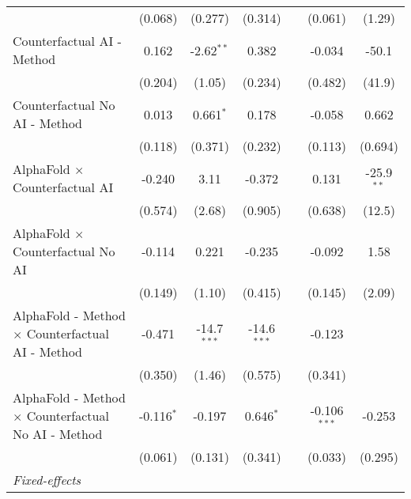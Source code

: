 \begin{tabular}{lcccccc}
                                                              & (0.068)       & (0.277)       & (0.314)        &                & (0.061)        & (1.29)\\   
   Counterfactual AI - Method                                 & 0.162         & -2.62$^{**}$  & 0.382          &                & -0.034         & -50.1\\   
                                                              & (0.204)       & (1.05)        & (0.234)        &                & (0.482)        & (41.9)\\   
   Counterfactual No AI - Method                              & 0.013         & 0.661$^{*}$   & 0.178          &                & -0.058         & 0.662\\   
                                                              & (0.118)       & (0.371)       & (0.232)        &                & (0.113)        & (0.694)\\   
   AlphaFold $\times$ Counterfactual AI                       & -0.240        & 3.11          & -0.372         &                & 0.131          & -25.9$^{**}$\\   
                                                              & (0.574)       & (2.68)        & (0.905)        &                & (0.638)        & (12.5)\\   
   AlphaFold $\times$ Counterfactual No AI                    & -0.114        & 0.221         & -0.235         &                & -0.092         & 1.58\\   
                                                              & (0.149)       & (1.10)        & (0.415)        &                & (0.145)        & (2.09)\\   
   AlphaFold - Method $\times$ Counterfactual AI - Method     & -0.471        & -14.7$^{***}$ & -14.6$^{***}$  &                & -0.123         &   \\   
                                                              & (0.350)       & (1.46)        & (0.575)        &                & (0.341)        &   \\   
   AlphaFold - Method $\times$ Counterfactual No AI - Method  & -0.116$^{*}$  & -0.197        & 0.646$^{*}$    &                & -0.106$^{***}$ & -0.253\\   
                                                              & (0.061)       & (0.131)       & (0.341)        &                & (0.033)        & (0.295)\\   
   \midrule
   \emph{Fixed-effects}\\

\end{tabular}
